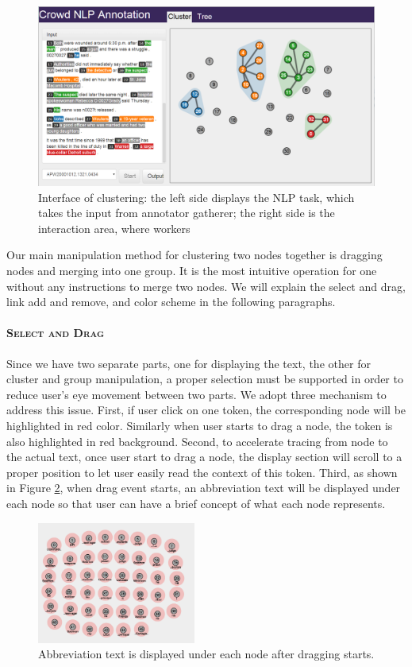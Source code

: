 \begin{figure}[th]
\centering
\includegraphics[width=6.1in]{figs/interface1_v2.png}
\caption{Interface of clustering: the left side displays the NLP task, which takes the input from annotator gatherer; the right side is the interaction area, where workers}
\label{fig:interface1.png}
\end{figure}

Our main manipulation method for clustering two nodes together is dragging nodes and merging into one group. It is the most intuitive operation for one without any instructions to merge two nodes. We will explain the select and drag, link add and remove, and color scheme in the following paragraphs.

\paragraph{\textsc{Select and Drag}\\}
Since we have two separate parts, one for displaying the text, the other for cluster and group manipulation, a proper selection must be supported in order to reduce user's eye movement between two parts. We adopt three mechanism to address this issue. First, if user click on one token, the corresponding node will be highlighted in red color. Similarly when user starts to drag a node, the token is also highlighted in red background. Second, to accelerate tracing from node to the actual text, once user start to drag a node, the display section will scroll to a proper position to let user easily read the context of this token. Third, as shown in Figure \ref{fig:abbrtext}, when drag event starts, an abbreviation text will be displayed under each node so that user can have a brief concept of what each node represents.

\begin{figure}[th]
\begin{center}
\includegraphics[height=4cm]{figs/abbrText.jpg}
\caption{Abbreviation text is displayed under each node after dragging starts.}
\label{fig:abbrtext}
\end{center}
\end{figure}

